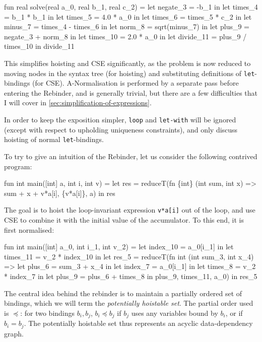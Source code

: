 \begin{colorcode}
fun real solve(real a_0, real b_1, real c_2) =
  let negate_3  = -b_1 in
  let times_4   = b_1 * b_1 in
  let times_5   = 4.0 * a_0 in
  let times_6   = times_5 * c_2 in
  let minus_7   = times_4 - times_6 in
  let norm_8    = sqrt(minus_7) in
  let plus_9    = negate_3 + norm_8 in
  let times_10  = 2.0 * a_0 in
  let divide_11 = plus_9 / times_10 in
  divide_11
\end{colorcode}

This simplifies hoisting and CSE significantly, as the problem is now
reduced to moving nodes in the syntax tree (for hoisting) and
substituting definitions of \texttt{let}-bindings (for CSE).
A-Normalisation is performed by a separate pass before entering the
Rebinder, and is generally trivial, but there are a few difficulties
that I will cover in \cref{sec:simplification-of-expressions}.

In order to keep the exposition simpler, \texttt{loop} and
\texttt{let-with} will be ignored (except with respect to upholding
uniqueness constraints), and only discuss hoisting of normal
\texttt{let}-bindings.

To try to give an intuition of the Rebinder, let us consider the
following contrived program:

\begin{colorcode}
fun int main([int] a, int i, int v) =
  let {res} =
    reduceT(fn \{int\} (int sum, int x) =>
              {sum + x + v*a[i]},
            \{v*a[i]\}, a) in
  res
\end{colorcode}

The goal is to hoist the loop-invariant expression \texttt{v*a[i]} out
of the loop, and use CSE to combine it with the initial value of the
accumulator.  To this end, it is first normalised:

\begin{colorcode}
fun int main([int] a_0, int i_1, int v_2) =
  let index_10 = a_0[i_1] in
  let times_11 = v_2 * index_10 in
  let {res_5} =
    reduceT(fn {int} (int sum_3, int x_4) =>
              let plus_6 = sum_3 + x_4 in
              let index_7 = a_0[i_1] in
              let times_8 = v_2 * index_7 in
              let plus_9 = plus_6 + times_8 in
              {plus_9},
            {times_11}, a_0) in
  res_5
\end{colorcode}

The central idea behind the rebinder is to maintain a partially
ordered set of bindings, which we will term the \textit{potentially
  hoistable set}.  The partial order used is $\preceq$: for two
bindings $b_{i}, b_{j}$, $b_{i} \preceq b_{j}$ if $b_{j}$ uses any
variables bound by $b_{i}$, or if $b_{i} = b_{j}$.  The potentially
hoistable set thus represents an acyclic data-dependency graph.

